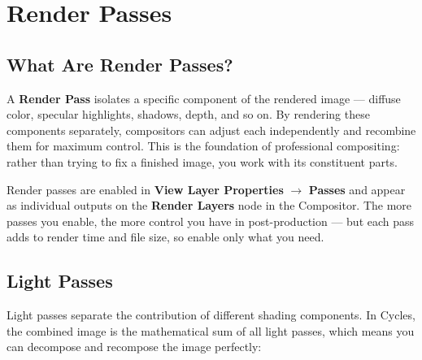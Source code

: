 \section{Render Passes}
\label{sec:render-passes}

\subsection{What Are Render Passes?}

A \textbf{Render Pass} isolates a specific component of the rendered image --- diffuse color, specular highlights, shadows, depth, and so on. By rendering these components separately, compositors can adjust each independently and recombine them for maximum control. This is the foundation of professional compositing: rather than trying to fix a finished image, you work with its constituent parts.

Render passes are enabled in \textbf{View Layer Properties} $\rightarrow$ \textbf{Passes} and appear as individual outputs on the \textbf{Render Layers} node in the Compositor. The more passes you enable, the more control you have in post-production --- but each pass adds to render time and file size, so enable only what you need.

\subsection{Light Passes}

Light passes separate the contribution of different shading components. In Cycles, the combined image is the mathematical sum of all light passes, which means you can decompose and recompose the image perfectly:

